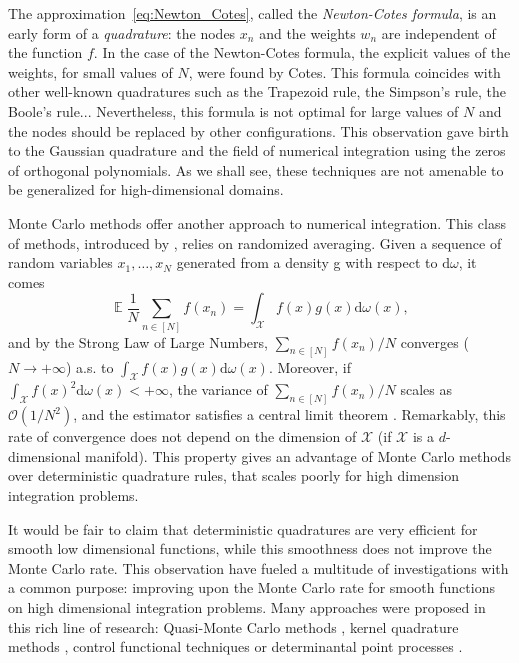 \documentclass[twoside,11pt]{book}
\numberwithin{theorem}{chapter}
\numberwithin{definition}{chapter}
\numberwithin{proposition}{chapter}
\numberwithin{corollary}{chapter}
\numberwithin{example}{chapter}
\numberwithin{lemma}{chapter}
\numberwithin{assumption}{chapter}
\DeclareMathOperator{\EX}{\mathbb{E}}
\begin{document}
The approximation~\eqref{eq:Newton_Cotes}, called the \emph{Newton-Cotes formula}, is an early form of a \emph{quadrature}: the nodes $x_{n}$ and the weights $w_{n}$ are independent of the function $f$. In the case of the Newton-Cotes formula, the explicit values of the weights, for small values of $N$, were found by Cotes. This formula coincides with other well-known quadratures such as the Trapezoid rule, the Simpson's rule, the Boole's rule... Nevertheless, this formula is not optimal for large values of $N$ and the nodes should be replaced by other configurations. This observation gave birth to the Gaussian quadrature and the field of numerical integration using the zeros of orthogonal polynomials.
As we shall see, these techniques are not amenable to be generalized for  high-dimensional domains.

Monte Carlo methods offer another approach to numerical integration. This class of methods, introduced by \cite{MeUl49},  relies on randomized averaging. Given a sequence of random variables $x_{1}, \dots, x_{N}$ generated from a density g with respect to $\mathrm{d}\omega$, it comes
\begin{equation}
\EX \frac{1}{N}\sum\limits_{n \in [N]} f(x_{n}) = \int_{\mathcal{X}} f(x)g(x) \mathrm{d}\omega(x),
\end{equation}
and by the Strong Law of Large Numbers, $ \sum_{n \in [N]} f(x_{n})/N$ converges ($N \rightarrow +\infty$) a.s. to $\displaystyle \int_{\mathcal{X}} f(x)g(x) \mathrm{d}\omega(x)$. Moreover, if $\displaystyle \int_{\mathcal{X}} f(x)^{2} \mathrm{d}\omega(x) < +\infty$, the variance of $\sum_{n \in [N]} f(x_{n})/N$ scales as $\mathcal{O}(1/N^{2})$, and the estimator satisfies a central limit theorem \citep{RoCa04}. 
Remarkably, this rate of convergence does not depend on the dimension of $\mathcal{X}$ (if $\mathcal{X}$ is a $d$-dimensional manifold). This property gives an advantage of Monte Carlo methods over deterministic quadrature rules, that scales poorly for high dimension integration problems. 

It would be fair to claim that deterministic quadratures are very efficient for smooth low dimensional functions, while this smoothness does not improve the Monte Carlo rate. This observation have fueled a multitude of investigations with a common purpose: improving upon the Monte Carlo rate for smooth functions on high dimensional integration problems. Many approaches were proposed in this rich line of research: Quasi-Monte Carlo methods \citep*{DiPi10}, kernel quadrature methods \citep*{Hic98} \citep{SmGrSoSc07} \citep{ChWeSm10}, control functional techniques \citep*{OaGi16} or  determinantal point processes \citep{BaHa16}.
\end{document}
